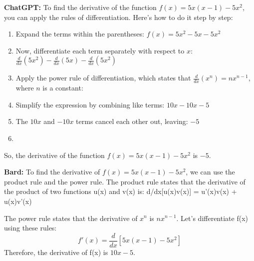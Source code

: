 \documentclass[11pt]{article} %
\begin{document}
\begin{mdframed}[
        backgroundcolor=white,  %
        linecolor=black,        %
        leftmargin=5pt,         %
        rightmargin=5pt,        %
        linewidth=2pt           %
    ]
    \textbf{ChatGPT: } To find the derivative of the function \(f(x) = 5x(x-1) - 5x^2\), you can apply the rules of differentiation. Here's how to do it step by step:

    \begin{enumerate}
        \item Expand the terms within the parentheses: \(f(x) = 5x^2 - 5x - 5x^2\)
        \item Now, differentiate each term separately with respect to \(x\): \\ \(\frac{d}{dx}(5x^2) - \frac{d}{dx}(5x) - \frac{d}{dx}(5x^2)\)
        \item Apply the power rule of differentiation, which states that \(\frac{d}{dx}(x^n) = n x^{n-1}\), where \(n\) is a constant:
        \item Simplify the expression by combining like terms: \(10x - 10x - 5\)
        \item The \(10x\) and \(-10x\) terms cancel each other out, leaving: \(-5\)
        \item
    \end{enumerate}
    So, the derivative of the function \(f(x) = 5x(x-1) - 5x^2\) is \(-5\).
\end{mdframed}

\begin{mdframed}[
        backgroundcolor=white,  %
        linecolor=black,        %
        leftmargin=5pt,         %
        rightmargin=5pt,        %
        linewidth=2pt           %
    ]
    \textbf{Bard: } To find the derivative of \(f(x) = 5x(x-1) - 5x^2\), we can use the product rule and the power rule.
    The product rule states that the derivative of the product of two functions u(x) and v(x) is:
    d/dx[u(x)v(x)] = u'(x)v(x) + u(x)v'(x)
    
    The power rule states that the derivative of $x^n$ is $nx^{n-1}$.
    Let's differentiate f(x) using these rules:
    $$
    f'(x)=\frac{d}{dx}[5x(x-1) - 5x^2]
    $$
    Therefore, the derivative of f(x) is $10x - 5$.
    
\end{mdframed}
\end{document}
